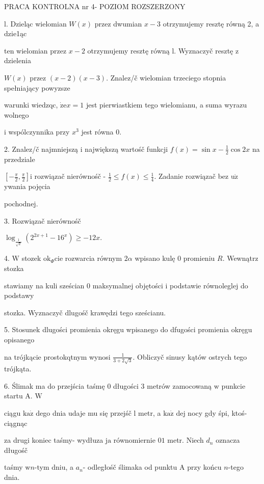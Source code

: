 \documentclass[a4paper,12pt]{article}
\begin{document}
PRACA KONTROLNA nr 4- POZIOM ROZSZERZONY

l. Dzieląc wielomian $W(x)$ przez dwumian $x-3$ otrzymujemy resztę równą 2, a dzie1ąc

ten wielomian przez $x-2$ otrzymujemy resztę równą l. Wyznaczyč resztę $\mathrm{z}$ dzielenia

$W(x)$ przez $(x-2)(x-3)$. Znalez/č wielomian trzeciego stopnia spełniający powyzsze

warunki wiedzqc, $\dot{\mathrm{z}}\mathrm{e}x=1$ jest pierwiastkiem tego wielomianu, a suma wyrazu wolnego

$\mathrm{i}$ wspólczynnika przy $x^{3}$ jest równa 0.

2. Znalez/č najmniejszą $\mathrm{i}$ największą wartośč funkcji $f(x)=\displaystyle \sin x-\frac{1}{2}\cos 2x$ na przedziale

$[-\displaystyle \frac{\pi}{2},\frac{\pi}{2}] \mathrm{i}$ rozwiązač nierównośč - $\displaystyle \frac{1}{2}\leq f(x)\leq\frac{1}{4}$. Zadanie rozwiązač bez $\mathrm{u}\dot{\mathrm{z}}$ ywania pojęcia

pochodnej.

3. Rozwiązač nierównośč

$\log_{\frac{1}{\sqrt{2}}}(2^{2x+1}-16^{x})\geq-12x.$

4. $\mathrm{W}$ stozek $\mathrm{o}\mathrm{k}_{\Phi}\mathrm{c}\mathrm{i}\mathrm{e}$ rozwarcia równym $ 2\alpha$ wpisano kulę $0$ promieniu $R$. Wewnątrz stozka

stawiamy na kuli sześcian $0$ maksymalnej objętości $\mathrm{i}$ podstawie równoleglej do podstawy

stozka. Wyznaczyč dlugośč krawędzi tego sześcianu.

5. Stosunek dlugości promienia okręgu wpisanego do dfugości promienia okręgu opisanego

na trójkącie prostokqtnym wynosi $\displaystyle \frac{1}{3+2\sqrt{3}}$. Obliczyč sinusy kątów ostrych tego trójkąta.

6. Ślimak ma do przejścia taśmę $0$ długości 3 metrów zamocowaną $\mathrm{w}$ punkcie startu A. $\mathrm{W}$

ciągu $\mathrm{k}\mathrm{a}\dot{\mathrm{z}}$ dego dnia udaje mu się przejśč l metr, a $\mathrm{k}\mathrm{a}\dot{\mathrm{z}}$ dej nocy gdy śpi, ktoś- ciągnąc

za drugi koniec taśmy- wydłuza $\mathrm{j}\mathrm{a}$ równomiernie $0 1$ metr. Niech $d_{n}$ oznacza długośč

taśmy $\mathrm{w}n$-tym dniu, a $a_{n}$- odległośč ślimaka od punktu A przy końcu $n$-tego dnia.
\end{document}
